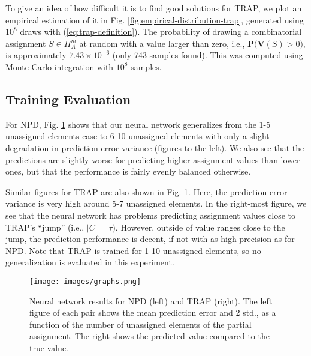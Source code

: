 \documentclass[runningheads]{llncs}
\begin{document}
	
	To give an idea of how difficult it is to find good solutions for TRAP, we plot an empirical estimation of it in Fig. \ref{fig:empirical-distribution-trap}, generated using $10^8$ draws with (\ref{eq:trap-definition}). The probability of drawing a combinatorial assignment $S \in \Pi_{A}^m$ at random with a value larger than zero, i.e., $\bm{P}\big(\bm{V}(S) > 0\big)$, is approximately $7.43\times 10^{-6}$ (only 743 samples found). This was computed using Monte Carlo integration with $10^8$ samples. %



	

	
	\subsection{Training Evaluation}
	For NPD, Fig. \ref{fig:NN-learning} shows that our neural network generalizes from the 1-5 unassigned elements case to 6-10 unassigned elements with only a slight degradation in prediction error variance (figures to the left). We also see that the predictions are slightly worse for predicting higher assignment values than lower ones, but that the performance is fairly evenly balanced otherwise.
	
	Similar figures for TRAP are also shown in Fig. \ref{fig:NN-learning}. Here, the prediction error variance is very high around 5-7 unassigned elements. In the right-most figure, we see that the neural network has problems predicting assignment values close to TRAP's ``jump'' (i.e., $|C| = \tau$). However, outside of value ranges close to the jump, the prediction performance is decent, if not with as high precision as for NPD. Note that TRAP is trained for 1-10 unassigned elements, so no generalization is evaluated in this experiment.
	
		\begin{figure}[H]
		\centering
		\texttt{[image: images/graphs.png]}
		\caption{Neural network results for {NPD} (left) and {TRAP} (right). The left figure of each pair shows the mean prediction error and 2 std., as a function of the number of unassigned elements of the partial assignment. The right shows the predicted value compared to the true value.}
		\label{fig:NN-learning}
	\end{figure}
	
\end{document}
